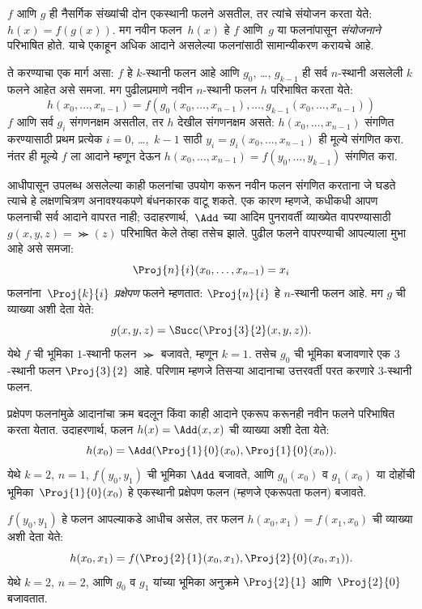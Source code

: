 \documentclass[../../../include/open-logic-section]{subfiles}
\begin{document}

$f$ आणि $g$ ही नैसर्गिक संख्यांची दोन एकस्थानी फलने असतील, तर त्यांचे
संयोजन करता येते: $h(x) = f(g(x))$. मग नवीन फलन~$h(x)$ हे $f$ आणि~$g$
या फलनांपासून \emph{संयोजनाने} परिभाषित होते. याचे एकाहून अधिक आदाने
असलेल्या फलनांसाठी सामान्यीकरण करायचे आहे.

ते करण्याचा एक मार्ग असा: $f$ हे $k$-स्थानी फलन आहे आणि $g_0$,
\dots, $g_{k-1}$ ही सर्व $n$-स्थानी असलेली $k$ फलने आहेत असे समजा.
मग पुढीलप्रमाणे नवीन $n$-स्थानी फलन $h$ परिभाषित करता येते:
\[
h(x_0, \dots, x_{n-1}) =
f(g_0(x_0, \dots, x_{n-1}), \dots, g_{k-1}(x_0, \dots, x_{n-1}))
\]
$f$ आणि सर्व $g_i$ संगणनक्षम असतील, तर $h$ देखील संगणनक्षम असते:
$h(x_0, \dots, x_{n-1})$ संगणित करण्यासाठी प्रथम प्रत्येक $i = 0$,
\dots,~$k-1$ साठी $y_i = g_i(x_0, \dots, x_{n-1})$ ही मूल्ये संगणित
करा. नंतर ही मूल्ये $f$ ला आदाने म्हणून देऊन
$h(x_0, \dots, x_{n-1}) = f(y_0, \dots, y_{k-1})$ संगणित करा.

आधीपासून उपलब्ध असलेल्या काही फलनांचा उपयोग करून नवीन फलन संगणित करताना
जे घडते त्याचे हे लक्षणचित्रण अनावश्यकपणे बंधनकारक वाटू शकते. एक कारण
म्हणजे, कधीकधी आपण फलनाची सर्व आदाने वापरत नाही; उदाहरणार्थ,~$\Add$
च्या आदिम पुनरावर्ती व्याख्येत वापरण्यासाठी $g(x, y, z) = \Succ(z)$
परिभाषित केले तेव्हा तसेच झाले. पुढील फलने वापरण्याची आपल्याला मुभा आहे
असे समजा:
\[
\Proj{n}{i}(x_0, \dots, x_{n-1}) = x_i
\]
फलनांना~$\Proj{k}{i}$ \emph{प्रक्षेपण} फलने म्हणतात:
$\Proj{n}{i}$ हे $n$-स्थानी फलन आहे. मग $g$ ची व्याख्या अशी देता येते:
\[
g(x, y, z) = \Succ(\Proj{3}{2}(x, y, z)).
\]
येथे $f$ ची भूमिका $1$-स्थानी फलन $\Succ$ बजावते, म्हणून $k=1$.
तसेच $g_0$ ची भूमिका बजावणारे एक $3$-स्थानी फलन $\Proj{3}{2}$ आहे.
परिणाम म्हणजे तिसऱ्या आदानाचा उत्तरवर्ती परत करणारे $3$-स्थानी फलन.

प्रक्षेपण फलनांमुळे आदानांचा क्रम बदलून किंवा काही आदाने एकरूप करूनही
नवीन फलने परिभाषित करता येतात. उदाहरणार्थ, फलन $h(x) = \Add(x, x)$ ची
व्याख्या अशी देता येते:
\[
h(x_0) = \Add(\Proj{1}{0}(x_0),\Proj{1}{0}(x_0)).
\]
येथे $k=2$, $n=1$, $f(y_0,y_1)$ ची भूमिका $\Add$ बजावते, आणि
$g_0(x_0)$ व $g_1(x_0)$ या दोहोंची भूमिका~$\Proj{1}{0}(x_0)$ हे
एकस्थानी प्रक्षेपण फलन (म्हणजे एकरूपता फलन) बजावते.

$f(y_0, y_1)$ हे फलन आपल्याकडे आधीच असेल, तर फलन
$h(x_0, x_1) = f(x_1, x_0)$ ची व्याख्या अशी देता येते:
\[
h(x_0, x_1) = f(\Proj{2}{1}(x_0, x_1),\Proj{2}{0}(x_0, x_1)).
\]
येथे $k=2$, $n = 2$, आणि $g_0$ व $g_1$ यांच्या भूमिका अनुक्रमे
$\Proj{2}{1}$ आणि~$\Proj{2}{0}$ बजावतात.
\end{document}
